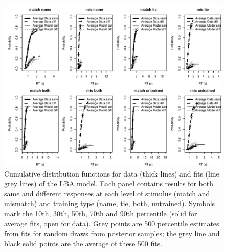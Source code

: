 \documentclass[
  man,floatsintext]{apa6}
\begin{document}
\begin{figure}[H]

{\centering \includegraphics[height=0.67\textheight,]{../../figures/ea/KN_fit} 

}

\caption{Cumulative distribution functions for data (thick lines) and fits (line grey lines) of the LBA model. Each panel contains results for both same and different responses at each level of stimulus (match and mismatch) and training type (name, tie, both, untrained). Symbols mark the 10th, 30th, 50th, 70th and 90th percentile (solid for average fits, open for data). Grey points are 500 percentile estimates from fits for random draws from posterior samples; the grey line and black solid points are the average of these 500 fits.}\label{fig:model-fit-plot}
\end{figure}
\end{document}
